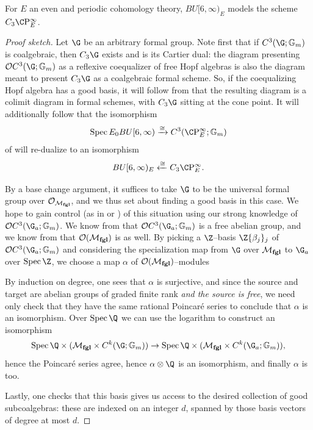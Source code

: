 \begin{theorem}
For \(E\) an even and periodic cohomology theory, \(BU[6, \infty)_E\) models the scheme \(C_3 \CP^\infty_E\).
\end{theorem}
\begin{proof}[Proof sketch]
Let \(\G\) be an arbitrary formal group.
Note first that if \(C^3(\G; \Gm)\) is coalgebraic, then \(C_3 \G\) exists and is its Cartier dual: the diagram presenting \(\sheaf OC^3(\G; \Gm)\) as a reflexive coequalizer of free Hopf algebras is also the diagram meant to present \(C_3 \G\) as a coalgebraic formal scheme.
So, if the coequalizing Hopf algebra has a good basis, it will follow from  that the resulting diagram is a colimit diagram in formal schemes, with \(C_3 \G\) sitting at the cone point.
It will additionally follow that the isomorphism \[\Spec E_0 BU[6, \infty) \xrightarrow{\cong} C^3(\CP^\infty_E; \Gm)\] of  will re-dualize to an isomorphism \[BU[6, \infty)_E \xleftarrow{\cong} C_3 \CP^\infty_E.\]

By a base change argument, it suffices to take \(\G\) to be the universal formal group over \(\mathcal{O}_{\mathcal{M}_{\mathbf{fgl}}}\), and we thus set about finding a good basis in this case.
We hope to gain control (as in  or ) of this situation using our strong knowledge of \(\sheaf O C^3(\G_a; \Gm)\).
We know from  that \(\sheaf O C^3(\G_a; \Gm)\) is a free abelian group, and we know from  that \(\mathcal{O}(\mathcal{M}_{\mathbf{fgl}})\) is as well.
By picking a \(\Z\)--basis \(\Z\{\beta_j\}_j\) of \(\sheaf O C^3(\G_a; \Gm)\) and considering the specialization map from \(\G\) over \(\mathcal{M}_{\mathbf{fgl}}\) to \(\G_a\) over \(\Spec \Z\), we choose a map \(\alpha\) of \(\mathcal{O}(\mathcal{M}_{\mathbf{fgl}})\)--modules
\begin{center}
\end{center}
By induction on degree, one sees that \(\alpha\) is surjective, and since the source and target are abelian groups of graded finite rank \emph{and the source is free}, we need only check that they have the same rational Poincar\'e series to conclude that \(\alpha\) is an isomorphism.
Over \(\Spec \Q\) we can use the logarithm to construct an isomorphism \[\Spec \Q \times (\moduli{fgl} \times C^k(\G; \Gm)) \to \Spec \Q \times (\moduli{fgl} \times C^k(\G_a; \Gm)),\] hence the Poincar\'e series agree, hence \(\alpha \otimes \Q\) is an isomorphism, and finally \(\alpha\) is too.

Lastly, one checks that this basis gives us access to the desired collection of good subcoalgebras: these are indexed on an integer \(d\), spanned by those basis vectors of degree at most \(d\).
\end{proof}
